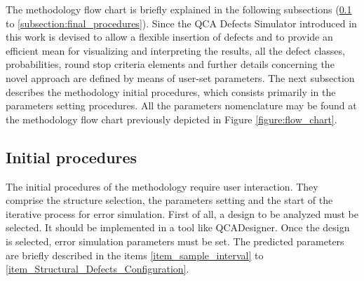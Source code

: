 The methodology flow chart is briefly explained in the following subsections (\ref{Initial_procedures} to \ref{subsection:final_procedures}). Since the QCA Defects Simulator introduced in this work is devised to allow a flexible insertion of defects and to provide an efficient mean for visualizing and interpreting the results, all the defect classes, probabilities, round stop criteria elements and further details concerning the novel approach are defined by means of user-set parameters. The next subsection describes the methodology initial procedures, which consists primarily in the parameters setting procedures. All the parameters nomenclature may be found at the methodology flow chart previously depicted in Figure \ref{figure:flow_chart}.

\subsection{Initial procedures}
\label{Initial_procedures}
The initial procedures of the methodology require user interaction. They comprise the structure selection, the parameters setting and the start of the iterative process for error simulation. First of all, a design to be analyzed must be selected. It should be implemented in a tool like QCADesigner. Once the design is selected, error simulation parameters must be set. The predicted parameters are briefly described in the items \ref{item_sample_interval} to \ref{item_Structural_Defects_Configuration}.
\pagebreak
